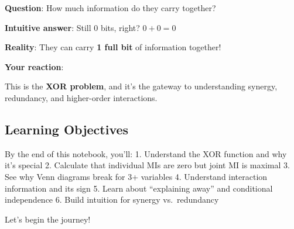 \documentclass[
  11pt,
  letterpaper,
  oneside,
  openany]{book}
\begin{document}
\textbf{Question}: How much information do they carry together?

\textbf{Intuitive answer}: Still 0 bits, right? \(0 + 0 = 0\)

\textbf{Reality}: They can carry \textbf{1 full bit} of information
together!

\textbf{Your reaction}: 🤯

This is the \textbf{XOR problem}, and it's the gateway to understanding
synergy, redundancy, and higher-order interactions.

\subsection{Learning Objectives}\label{learning-objectives}

By the end of this notebook, you'll: 1. Understand the XOR function and
why it's special 2. Calculate that individual MIs are zero but joint MI
is maximal 3. See why Venn diagrams break for 3+ variables 4. Understand
interaction information and its sign 5. Learn about ``explaining away''
and conditional independence 6. Build intuition for synergy
vs.~redundancy

Let's begin the journey!
\end{document}
